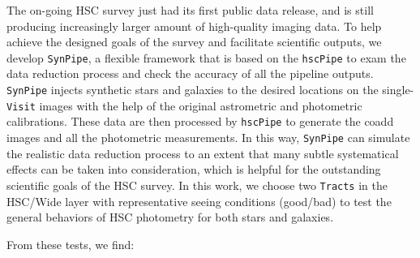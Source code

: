 \documentclass[useamsfonts]{pasj01}
\def\hscpipe{\texttt{hscPipe}}
\def\synpipe{\texttt{SynPipe}}
\def\visit{\texttt{Visit}}
\def\tracts{\texttt{Tracts}}
\begin{document}
    The on-going HSC survey just had its first public data release, and is still
    producing increasingly larger amount of high-quality imaging data.
    To help achieve the designed goals of the survey and facilitate scientific
    outputs, we develop \synpipe{}, a flexible framework that is based on the
    \hscpipe{} to exam the data reduction process and check the accuracy of all the
    pipeline outputs.
    \synpipe{} injects synthetic stars and galaxies to the desired locations on the
    single-\visit{} images with the help of the original astrometric and
    photometric calibrations.
    These data are then processed by \hscpipe{} to generate the coadd images and
    all the photometric measurements.
    In this way, \synpipe{} can simulate the realistic data reduction process
    to an extent that many subtle systematical effects can be taken into
    consideration, which is helpful for the outstanding scientific goals of the HSC
    survey.
    In this work, we choose two \tracts{} in the HSC/Wide layer with
    representative seeing conditions (good/bad) to test the general behaviors of HSC
    photometry for both stars and galaxies.

    From these tests, we find:
\end{document}

